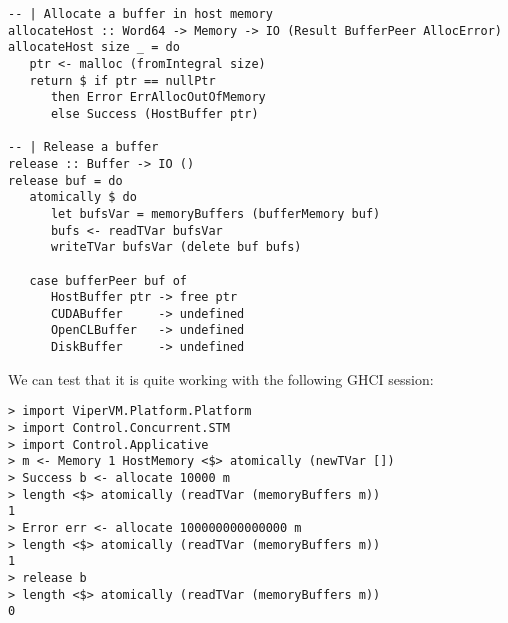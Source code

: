 \begin{lstlisting}
-- | Allocate a buffer in host memory
allocateHost :: Word64 -> Memory -> IO (Result BufferPeer AllocError)
allocateHost size _ = do
   ptr <- malloc (fromIntegral size)
   return $ if ptr == nullPtr
      then Error ErrAllocOutOfMemory
      else Success (HostBuffer ptr)

-- | Release a buffer
release :: Buffer -> IO ()
release buf = do
   atomically $ do
      let bufsVar = memoryBuffers (bufferMemory buf)
      bufs <- readTVar bufsVar
      writeTVar bufsVar (delete buf bufs)

   case bufferPeer buf of
      HostBuffer ptr -> free ptr
      CUDABuffer     -> undefined
      OpenCLBuffer   -> undefined
      DiskBuffer     -> undefined
\end{lstlisting}

We can test that it is quite working with the following GHCI session:
\begin{lstlisting}
> import ViperVM.Platform.Platform
> import Control.Concurrent.STM
> import Control.Applicative
> m <- Memory 1 HostMemory <$> atomically (newTVar [])
> Success b <- allocate 10000 m
> length <$> atomically (readTVar (memoryBuffers m))
1
> Error err <- allocate 100000000000000 m
> length <$> atomically (readTVar (memoryBuffers m))
1
> release b
> length <$> atomically (readTVar (memoryBuffers m))
0
\end{lstlisting}

